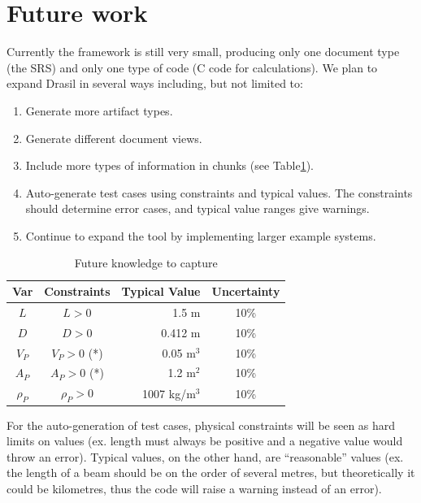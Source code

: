 \documentclass{sig-alternate-05-2015}
\newcommand{\lss}{Drasil}
\begin{document}
\section{Future work} \label{sec:todo}

Currently the framework is still very small, producing only one document type
(the SRS) and only one type of code (C code for calculations). We plan to expand
\lss{} in several ways including, but not limited to:

\begin{enumerate}
\setlength{\itemsep}{0pt}
\setlength{\parskip}{0pt}
\setlength{\parsep}{0pt}
\item Generate more artifact types. %
\item Generate different document views. %
\item Include more types of information in chunks (see Table\ref{tab:pcm}).
\item Auto-generate test cases using constraints and typical values. The
  constraints should determine error cases, and typical value ranges give
  warnings.
\item Continue to expand the tool by implementing larger example systems.
\end{enumerate}

\begin{table} \label{tab:pcm}
\centering
\caption{Future knowledge to capture}
\begin{tabular}{|c|c|r|c|} \hline
\textbf{Var} & \textbf{Constraints} & \textbf{Typical Value} & \textbf{Uncertainty}\\ \hline
$L$ & $L > 0$ & 1.5 m & 10\% \\ \hline
$D$ & $D > 0$ & 0.412 m & 10\% \\ \hline
$V_P$ & $V_P > 0$ (*)	& 0.05 m$^3$	& 10\% \\ \hline
$A_P$ & $A_P > 0$ (*)	& 1.2 m$^2$	& 10\% \\ \hline
$\rho_P$ & $\rho_P > 0$	& 1007 kg/m$^3$	& 10\% \\
\hline\end{tabular}
\end{table}

For the auto-generation of test cases, physical constraints will be seen as hard
limits on values (ex. length must always be positive and a negative value would
throw an error). Typical values, on the other hand, are ``reasonable'' values
(ex. the length of a beam should be on the order of several metres, but
theoretically it could be kilometres, thus the code will raise a warning instead
of an error).
\end{document}
